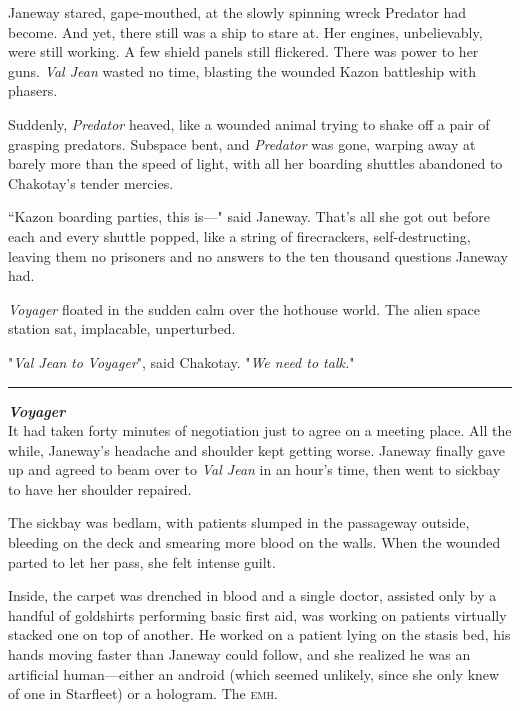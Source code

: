 \documentclass[twoside,letterpaper,12pt]{memoir}
\begin{document}
Janeway stared, gape-mouthed, at the slowly spinning wreck Predator had become. And yet, there still was a ship to stare at. Her engines, unbelievably, were still working. A few shield panels still flickered. There was power to her guns. \textit{Val Jean} wasted no time, blasting the wounded Kazon battleship with phasers.

Suddenly, \textit{Predator} heaved, like a wounded animal trying to shake off a pair of grasping predators. Subspace bent, and \textit{Predator} was gone, warping away at barely more than the speed of light, with all her boarding shuttles abandoned to Chakotay's tender mercies.

``Kazon boarding parties, this is---" said Janeway. That's all she got out before each and every shuttle popped, like a string of firecrackers, self-destructing, leaving them no prisoners and no answers to the ten thousand questions Janeway had.

\textit{Voyager} floated in the sudden calm over the hothouse world. The alien space station sat, implacable, unperturbed.

"\textit{Val Jean} \textit{to} \textit{Voyager}", said Chakotay. "\textit{We need to talk.}"

\begin{center}\rule{3cm}{0.4 pt}\end{center}

\noindent\textit{\textbf{Voyager}}\\

It had taken forty minutes of negotiation just to agree on a meeting place. All the while, Janeway's headache and shoulder kept getting worse. Janeway finally gave up and agreed to beam over to \textit{Val Jean} in an hour's time, then went to sickbay to have her shoulder repaired.

The sickbay was bedlam, with patients slumped in the passageway outside, bleeding on the deck and smearing more blood on the walls. When the wounded parted to let her pass, she felt intense guilt.

Inside, the carpet was drenched in blood and a single doctor, assisted only by a handful of goldshirts performing basic first aid, was working on patients virtually stacked one on top of another. He worked on a patient lying on the stasis bed, his hands moving faster than Janeway could follow, and she realized he was an artificial human---either an android (which seemed unlikely, since she only knew of one in Starfleet) or a hologram. The \textsc{emh}.
\end{document}
